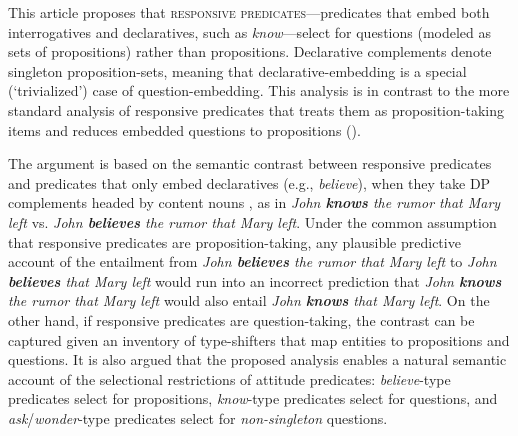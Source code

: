 This article proposes that \textsc{responsive predicates}—predicates that embed both interrogatives and declaratives, such as \textit{know}—select for questions (modeled as sets of propositions) rather than propositions. Declarative complements denote singleton proposition-sets, meaning that declarative-embedding is a special (‘trivialized’) case of question-embedding. This analysis is in contrast to the more standard analysis of responsive predicates that treats them as proposition-taking items and reduces embedded questions to propositions (\cite{groenendijk-stokhof1984-thesis,lahiri.u2002}).\par The argument is based on the semantic contrast between responsive predicates and predicates that only embed declaratives (e.g., \textit{believe}), when they take DP complements headed by content nouns \parencite{vendler1972}, as in \textit{John \textbf{knows} the rumor that Mary left} vs. \textit{John \textbf{believes} the rumor that Mary left}. Under the common assumption that responsive predicates are proposition-taking, any plausible predictive account of the entailment from \textit{John \textbf{believes} the rumor that Mary left} to \textit{John \textbf{believes} that Mary left} would run into an incorrect prediction that \textit{John \textbf{knows} the rumor that Mary left} would also entail \textit{John \textbf{knows} that Mary left}. On the other hand, if responsive predicates are question-taking, the contrast can be captured given an inventory of type-shifters that map entities to propositions and questions. It is also argued that the proposed analysis enables a natural semantic account of the selectional restrictions of attitude predicates: \textit{believe}-type predicates select for propositions, \textit{know}-type predicates select for questions, and \textit{ask}/\textit{wonder}-type predicates select for \textit{non-singleton} questions.
\endinput